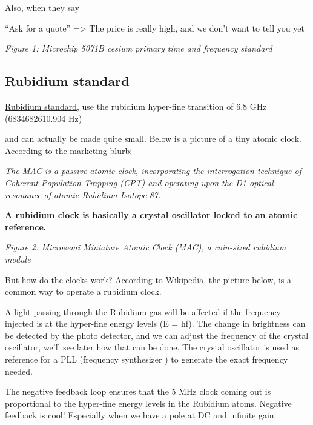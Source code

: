 Also, when they say

``Ask for a quote'' =\textgreater{} The price is really high, and we
don't want to tell you yet


{
\centering
{}
}

\emph{Figure 1: Microchip 5071B cesium primary time and frequency
standard}

\subsection{Rubidium standard}\label{rubidium-standard}

\href{https://en.wikipedia.org/wiki/Rubidium_standard}{Rubidium
standard}, use the rubidium hyper-fine transition of 6.8 GHz
(6834682610.904 Hz)

and can actually be made quite small. Below is a picture of a tiny
atomic clock. According to the marketing blurb:

\emph{The MAC is a passive atomic clock, incorporating the interrogation
technique of Coherent Population Trapping (CPT) and operating upon the
D1 optical resonance of atomic Rubidium Isotope 87.}

\textbf{A rubidium clock is basically a crystal oscillator locked to an
atomic reference.}


{
\centering
{}
}

\emph{Figure 2: Microsemi Miniature Atomic Clock (MAC), a coin-sized
rubidium module}

But how do the clocks work? According to Wikipedia, the picture below,
is a common way to operate a rubidium clock.

A light passing through the Rubidium gas will be affected if the
frequency injected is at the hyper-fine energy levels (E = hf). The
change in brightness can be detected by the photo detector, and we can
adjust the frequency of the crystal oscillator, we'll see later how that
can be done. The crystal oscillator is used as reference for a PLL
(frequency synthesizer ) to generate the exact frequency needed.

The negative feedback loop ensures that the 5 MHz clock coming out is
proportional to the hyper-fine energy levels in the Rubidium atoms.
Negative feedback is cool! Especially when we have a pole at DC and
infinite gain.


{
\centering
{}
}

